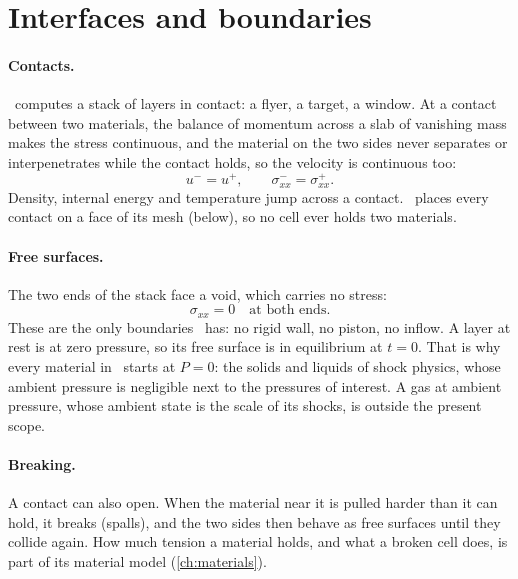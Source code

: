 \section{Interfaces and boundaries}
\label{sec:boundaries}

\paragraph{Contacts.} \bw\ computes a stack of layers in contact: a
flyer, a target, a window. At a contact between two materials, the
balance of momentum across a slab of vanishing mass makes the stress
continuous, and the material on the two sides never separates or
interpenetrates while the contact holds, so the velocity is continuous
too:
\begin{equation}
u^- = u^+, \qquad \sigma_{xx}^- = \sigma_{xx}^+ .
\label{eq:cm-contact}
\end{equation}
Density, internal energy and temperature jump across a contact. \bw\
places every contact on a face of its mesh (below), so no cell ever holds
two materials.

\paragraph{Free surfaces.} The two ends of the stack face a void, which
carries no stress:
\begin{equation}
\sigma_{xx} = 0 \quad\text{at both ends.}
\label{eq:cm-free}
\end{equation}
These are the only boundaries \bw\ has: no rigid wall, no piston, no
inflow. A layer at rest is at zero pressure, so its free surface is in
equilibrium at $t = 0$. That is why every material in \bw\ starts at
$P = 0$: the solids and liquids of shock physics, whose ambient pressure
is negligible next to the pressures of interest.
A gas at ambient pressure, whose ambient state is the scale of its shocks,
is outside the present scope.

\paragraph{Breaking.} A contact can also open. When the material near it
is pulled harder than it can hold, it breaks (spalls), and the two sides
then behave as free surfaces until they collide again. How much tension a
material holds, and what a broken cell does, is part of its material model
(\cref{ch:materials}).

